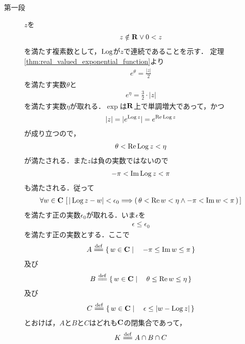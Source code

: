 	\begin{sketch}\mbox{}
		\begin{description}
			\item[第一段]
				$z$を
				\begin{align}
					z \notin \mathbf{R} \vee 0 < z
				\end{align}
				を満たす複素数として，$\operatorname{Log}$が$z$で連続であることを示す．
				定理\ref{thm:real_valued_exponential_function}より
				\begin{align}
					e^{\theta} = \frac{|z|}{2}
				\end{align}
				を満たす実数$\theta$と
				\begin{align}
					e^{\eta} = \frac{3}{2} \cdot |z|
				\end{align}
				を満たす実数$\eta$が取れる．$\exp$は$\mathbf{R}$上で単調増大であって，かつ
				\begin{align}
					|z| = |e^{\operatorname{Log}{z}}| = e^{\operatorname{Re} \operatorname{Log}{z}}
				\end{align}
				が成り立つので，
				\begin{align}
					\theta < \operatorname{Re} \operatorname{Log}{z} < \eta
				\end{align}
				が満たされる．また$z$は負の実数ではないので
				\begin{align}
					-\pi < \operatorname{Im} \operatorname{Log}{z} < \pi
				\end{align}
				も満たされる．従って
				\begin{align}
					\forall w \in \mathbf{C}\,
					\left[\, |\operatorname{Log}{z} - w| < \epsilon_0
					\Longrightarrow \left(\, \theta < \operatorname{Re} w < \eta
					\wedge -\pi < \operatorname{Im} w < \pi\, \right)\, \right]
				\end{align}
				を満たす正の実数$\epsilon_0$が取れる．いま$\epsilon$を
				\begin{align}
					\epsilon \leq \epsilon_0
				\end{align}
				を満たす正の実数とする．ここで
				\begin{align}
					A \defeq \Set{w \in \C}{-\pi \leq \Im{w} \leq \pi}
				\end{align}
				及び
				\begin{align}
					B \defeq \Set{w \in \C}{\theta \leq \Re{w} \leq \eta}
				\end{align}
				及び
				\begin{align}
					C \defeq \Set{w \in \C}{\epsilon \leq |w - \pvlog{z}|}
				\end{align}
				とおけば，$A$と$B$と$C$はどれも$\mathbf{C}$の閉集合であって，
				\begin{align}
					K \defeq A \cap B \cap C

\end{align}
\end{description}
\end{sketch}
